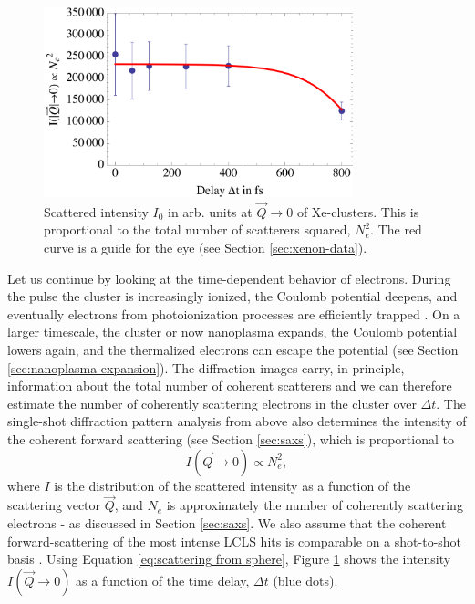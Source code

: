 \begin{figure}
	\centering
		\includegraphics[width=0.80\textwidth]{images/results/number-of-scatterers.png}
	\caption[Time-resolved behavior of number of scatterers due to nanoplasma expansion]{Scattered intensity $I_{0}$ in arb. units at $\vec{Q}\rightarrow 0$ of Xe-clusters. This is proportional to the total number of scatterers squared, $N_{e}^{2}$. The red curve is a guide for the eye (see Section \ref{sec:xenon-data}).}
	\label{fig:number-of-scatterer}
\end{figure}
%
Let us continue by looking at the time-dependent behavior of electrons. During the pulse the cluster is increasingly ionized, the Coulomb potential deepens, and eventually electrons from photoionization processes are efficiently trapped \cite{Arbeiter-2011-NJP}. On a larger timescale, the cluster or now nanoplasma expands, the Coulomb potential lowers again, and the thermalized electrons can escape the potential (see Section \ref{sec:nanoplasma-expansion}). The diffraction images carry, in principle, information about the total number of coherent scatterers and we can therefore estimate the number of coherently scattering electrons in the cluster over $\Delta t$. The single-shot diffraction pattern analysis from above also determines the intensity of the coherent forward scattering (see Section \ref{sec:saxs}), which is proportional to
\begin{equation}{}
I\left(\vec{Q}\rightarrow 0\right) \propto N_{e}^{2},
\label{eq:intensity-prop-to-electrons}
\end{equation}
where $I$ is the distribution of the scattered intensity as a function of the scattering vector $\vec{Q}$, and $N_{e}$ is approximately the number of coherently scattering electrons - as discussed in Section \ref{sec:saxs}. We also assume that the coherent forward-scattering of the most intense LCLS hits is comparable on a shot-to-shot basis \cite{Gorkhover-2012-PRL}. Using Equation \eqref{eq:scattering from sphere}, Figure \ref{fig:number-of-scatterer} shows the intensity $I\left(\vec{Q}\rightarrow 0\right)$ as a function of the time delay, $\Delta t$ (blue dots).
